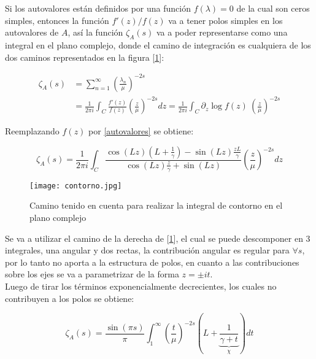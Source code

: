 Si los  autovalores están definidos por una función $f(\lambda ) = 0$ de la cual son ceros simples, entonces la función $f'(z) / f(z) $ va a tener polos simples en los autovalores de $A$, así la  función $\zeta _A (s)$ va a poder representarse como una integral en el plano complejo, donde el camino de integración es cualquiera de los dos caminos representados en la figura [\ref{fig:contorno}]:

\begin{equation}
\begin{aligned}
   \zeta _A (s) &=  \sum _{n=1} ^{\infty} \left( \frac{\lambda _n}{\mu} \right) ^{-2s} \\[5pt] &=  
   \frac{1}{2 \pi i} \int _{C} \frac{f'(z)}{f(z)} \left( \frac{z}{\mu} \right) ^{-2s} dz 
   =  \frac{1}{2 \pi i} \int _{C} \partial _z \log f(z) \ 
	   \left( \frac{z}{\mu} \right) ^{-2s}
\end{aligned}
\label{asd}
\end{equation}

Reemplazando $f(z)$ por  \ref{autovalores} se obtiene:

\begin{equation}
	\zeta _A (s) = 
    \frac{1}{2 \pi i} \int _{C}
    \frac{ \cos (L z) \left(L + \frac{1}{\gamma} \right) - \sin(L z) \frac{z L}{\gamma}
    }
    { \cos(L z) \frac{z}{\gamma} + \sin(L z)
    }
    \left( \frac{z}{\mu} \right) ^{-2 s} dz
\end{equation}


\begin{figure}
\centering
\texttt{[image: contorno.jpg]}
\caption{Camino tenido en cuenta para realizar la integral de contorno en el plano complejo}
\label{fig:contorno}
\end{figure}




Se va a utilizar el camino de la derecha de [\ref{fig:contorno}], el cual se puede descomponer en 3 integrales, una angular y dos rectas, la contribución angular es regular para $ \forall s$, por lo tanto no aporta a la estructura de polos, en cuanto a las contribuciones sobre los ejes se va a parametrizar de la forma $z = \pm i  t$. \\ 


	Luego de tirar los términos exponencialmente decrecientes, los cuales no contribuyen a los polos se obtiene:

\begin{equation}
	\zeta _A (s) = 
    \frac{ \sin (\pi s)}{ \pi } 
    \int _1 ^{\infty} 
    \left( \frac{t}{\mu}  \right)^{-2s}
    \left(
    	L + 
	    \underbrace
    	{
		\frac{1}{\gamma + t}   
		} _{\chi} 
	\right)
    dt 
\label{contorno}
\end{equation}

